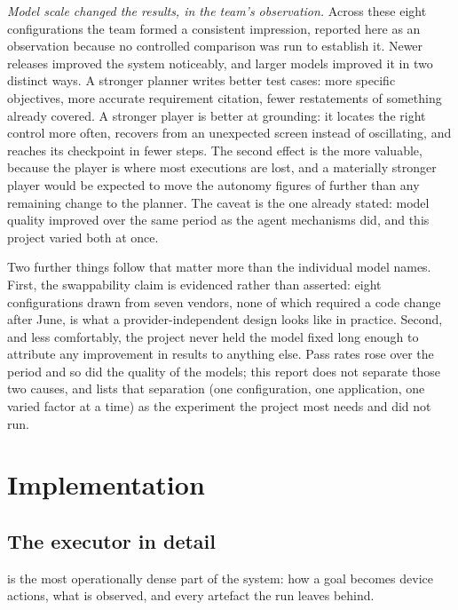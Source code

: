 \endgroup

\emph{Model scale changed the results, in the team's observation.} Across these
eight configurations the team formed a consistent impression, reported here as
an observation because no controlled comparison was run to establish it. Newer
releases improved the system noticeably, and larger models improved it in two
distinct ways. A stronger planner writes better test cases: more specific
objectives, more accurate requirement citation, fewer restatements of something
already covered. A stronger player is better at grounding: it locates the right
control more often, recovers from an unexpected screen instead of oscillating,
and reaches its checkpoint in fewer steps. The second effect is the more
valuable, because the player is where most executions are lost, and a
materially stronger player would be expected to move the autonomy figures of
 further than any remaining change to the planner. The
caveat is the one already stated: model quality improved over the same period
as the agent mechanisms did, and this project varied both at once.

Two further things follow that matter more than the individual model names.
First, the swappability claim is evidenced rather than asserted: eight configurations drawn
from seven vendors, none of which required a code change after June, is what a
provider-independent design looks like in practice. Second, and less
comfortably, the project never held the model fixed long enough to attribute
any improvement in results to anything else. Pass rates rose over the period
and so did the quality of the models; this report does not separate those two
causes, and  lists that separation (one configuration,
one application, one varied factor at a time) as the experiment the project
most needs and did not run.

\section{Implementation}
\label{sec:implementation}

\subsection{The executor in detail}

 is the most operationally dense part of the system: how a
goal becomes device actions, what is observed, and every artefact the run leaves
behind.


